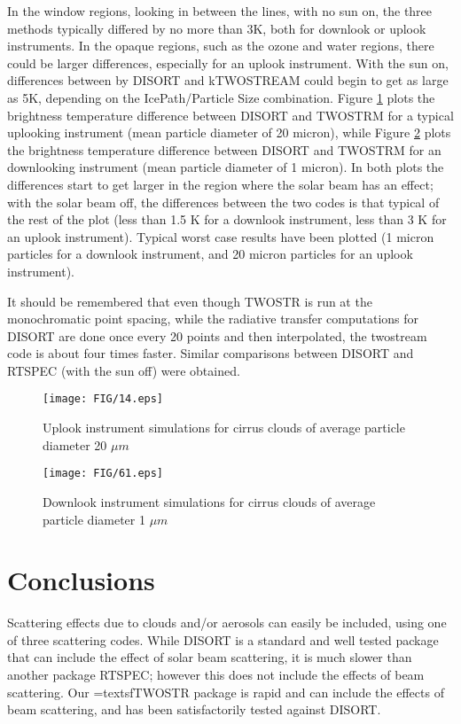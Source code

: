 \documentclass[11pt]{article}
\begin{document}
In the window regions, looking in between the lines, with no 
sun on, the three methods typically differed by no more than 3K, both for 
downlook or uplook instruments. In the opaque regions, such as the ozone and 
water regions, there could be larger differences, especially for an uplook 
instrument. With the sun on, differences between by \textsf{DISORT} and 
\textsf{kTWOSTREAM} could begin to get as large as 5K, depending on the 
IcePath/Particle Size combination. Figure \ref{fig:solar_uplook_20um} plots 
the brightness temperature difference between \textsf{DISORT} and 
\textsf{TWOSTRM} for a typical uplooking instrument (mean particle diameter 
of 20 micron), while Figure \ref{fig:solar_downlook_1um} plots the 
brightness temperature difference between \textsf{DISORT} and 
\textsf{TWOSTRM} for an downlooking instrument (mean particle diameter 
of 1 micron). In both plots the differences start to get larger in the region
where the solar beam has an effect; with the solar beam off, the differences
between the two codes is that typical of the rest of the plot (less than 1.5 K
for a downlook instrument, less than 3 K for an uplook instrument).
Typical worst case results have been plotted (1 micron particles for a 
downlook instrument, and 20 micron particles for an uplook instrument). 

It should be remembered that even though \textsf{TWOSTR} is run at the 
monochromatic point spacing, while the radiative transfer computations for 
\textsf{DISORT} are done once every 20 points and then interpolated, the
twostream code is about four times faster. Similar comparisons between
\textsf{DISORT} and \textsf{RTSPEC} (with the sun off) were obtained.

\begin{figure}
\texttt{[image: FIG/14.eps]}
\caption{Uplook instrument simulations for cirrus clouds of average particle 
diameter 20 $\mu m$} 
\label{fig:solar_uplook_20um}
\end{figure}

\begin{figure}
\texttt{[image: FIG/61.eps]}
\caption{Downlook instrument simulations for cirrus clouds of average 
particle diameter 1 $\mu m$}
\label{fig:solar_downlook_1um}
\end{figure}

\section{Conclusions}
Scattering effects due to clouds and/or aerosols can easily be 
included, using one of three scattering codes. While \textsf{DISORT} is a 
standard and well tested package that can include the effect of solar beam 
scattering, it is much slower than another package \textsf{RTSPEC}; however
this does not include the effects of beam scattering. Our =textsf{TWOSTR}
package is rapid and can include the effects of beam scattering, and has been
satisfactorily tested against \textsf{DISORT}.
\end{document}

